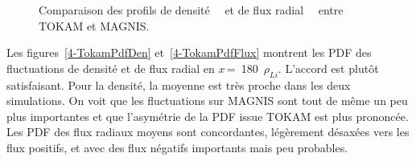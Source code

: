 \begin{refsection}
\begin{figure}[!htbp]
  \centering
    \caption{Comparaison des profils de
    densité~~ et de flux
    radial~~ entre TOKAM et MAGNIS.}
    \label{4-TokamProfils}
\end{figure}

Les figures~\ref{4-TokamPdfDen} et~\ref{4-TokamPdfFlux} montrent les PDF des
fluctuations de densité et de flux radial en $x\,$=~180~$\rho_{Li}$. L'accord
est plutôt satisfaisant. Pour la densité, la moyenne est très proche dans les
deux simulations. On voit que les fluctuations sur MAGNIS sont tout de même un
peu plus importantes et que l'asymétrie de la PDF issue TOKAM est plus
prononcée.
Les PDF des flux radiaux moyens sont concordantes, légèrement désaxées vers les
flux positifs, et avec des flux négatifs importants mais peu probables.


\end{refsection}

